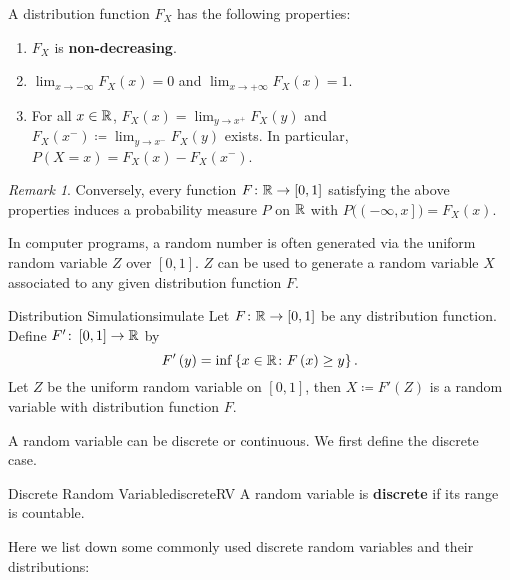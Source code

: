 \documentclass[math, code]{amznotes}
\theoremstyle{remark}
\newtheorem*{remark}{Remark}
\begin{document}
A distribution function $F_X$ has the following properties:
\begin{enumerate}
    \item $F_X$ is \textbf{non-decreasing}.
    \item $\lim_{x \to -\infty}F_X\left(x\right) = 0$ and $\lim_{x \to +\infty}F_X\left(x\right) = 1$.
    \item For all $x \in \mathbb{R}$, $F_X\left(x\right) = \lim_{y \to x^+}F_X\left(y\right)$ and $F_X\left(x^-\right) \coloneqq \lim_{y \to x^-}F_X\left(y\right)$ exists. In particular, $P\left(X = x\right) = F_X\left(x\right) - F_X\left(x^-\right)$.
\end{enumerate}
\begin{notebox}
    \begin{remark}
        Conversely, every function $F \colon \mathbb{R} \to \left[0, 1\right]$ satisfying the above properties induces a probability measure $P$ on $\mathbb{R}$ with $P\bigl(\left(-\infty, x\right]\bigr) = F_X\left(x\right)$.
    \end{remark}
\end{notebox}
In computer programs, a random number is often generated via the uniform random variable $Z$ over $\left[0, 1\right]$. $Z$ can be used to generate a random variable $X$ associated to any given distribution function $F$.
\begin{thmbox}{Distribution Simulation}{simulate}
    Let $F \colon \mathbb{R} \to \left[0, 1\right]$ be any distribution function. Define $F' \colon \left[0, 1\right] \to \mathbb{R}$ by
    \begin{equation*}
        F'\left(y\right) = \inf \left\{x \in \mathbb{R} \colon F\left(x\right) \geq y\right\}.
    \end{equation*}
    Let $Z$ be the uniform random variable on $\left[0, 1\right]$, then $X \coloneqq F'\left(Z\right)$ is a random variable with distribution function $F$.
\end{thmbox}
A random variable can be discrete or continuous. We first define the discrete case.
\begin{dfnbox}{Discrete Random Variable}{discreteRV}
    A random variable is {\color{red} \textbf{discrete}} if its range is countable.
\end{dfnbox}
Here we list down some commonly used discrete random variables and their distributions:
\end{document}
